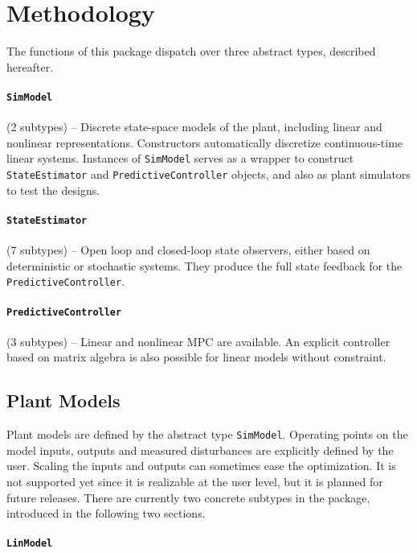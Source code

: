 
\section{Methodology}

The functions of this package dispatch over three abstract types, described hereafter.

\paragraph{\texttt{SimModel}} (2 subtypes) -- Discrete state-space models of the plant, including linear and nonlinear representations. Constructors automatically discretize continuous-time linear systems. Instances of \texttt{SimModel} serves as a wrapper to construct \texttt{StateEstimator} and \texttt{PredictiveController} objects, and also as plant simulators to test the designs.

\paragraph{\texttt{StateEstimator}} (7 subtypes) -- Open loop and closed-loop state observers, either based on deterministic or stochastic systems. They produce the full state feedback for the \texttt{PredictiveController}.

\paragraph{\texttt{PredictiveController}} (3 subtypes)  -- Linear and nonlinear MPC are available. An explicit controller based on matrix algebra is also possible for linear models without constraint.

\subsection{Plant Models}

Plant models are defined by the abstract type \texttt{SimModel}. Operating points on the model inputs, outputs and measured disturbances are explicitly defined by the user. Scaling the inputs and outputs can sometimes ease the optimization. It is not supported yet since it is realizable at the user level, but it is planned for future releases. There are currently two concrete subtypes in the package, introduced in the following two sections. 

\paragraph{\texttt{LinModel}}

